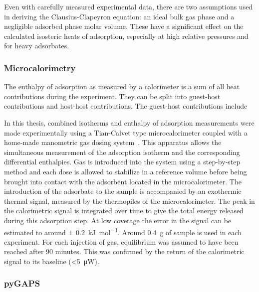 Even with carefully measured experimental data, there are two 
assumptions used in deriving the Clausius-Clapeyron equation: 
an ideal bulk gas phase and a negligible adsorbed phase
molar volume. These have a significant effect on the calculated 
isosteric heats of adsorption, especially at high relative pressures 
and for heavy adsorbates.

\subsubsection{Microcalorimetry}


The enthalpy of adsorption as measured by a calorimeter is a 
sum of all heat contributions during the experiment. They can 
be split into guest-host contributions and host-host contributions.
The guest-host contributions include 

In this thesis, combined isotherms and enthalpy of adsorption
measurements were made experimentally using a Tian-Calvet type
microcalorimeter coupled with a home-made manometric gas dosing
system~\cite{llewellynGasAdsorptionMicrocalorimetry2005}. 
This apparatus allows the simultaneous measurement 
of the adsorption isotherm and the corresponding differential 
enthalpies. Gas is introduced into the system using a step-by-step
method and each dose is allowed to stabilize in a
reference volume before being brought into contact with the
adsorbent located in the microcalorimeter. The introduction of the
adsorbate to the sample is accompanied by an exothermic thermal signal,
measured by the thermopiles of the microcalorimeter. The peak in the
calorimetric signal is integrated over time 
to give the total energy released during this adsorption step.
At low coverage the error in the signal can be estimated to around 
\( \pm \) \SI{0.2} {\kilo\joule\per\mol}. Around \SI{0.4}{\gram} of 
sample is used in each experiment. 
For each injection of gas, equilibrium was assumed to have
been reached after 90 minutes. This was confirmed by the return
of the calorimetric signal to its baseline (<\SI{5}{\micro\watt}).


\subsubsection{pyGAPS}